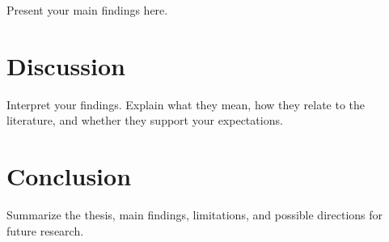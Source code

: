 \documentclass[12pt,a4paper]{article}
\begin{document}
Present your main findings here.

\section{Discussion}

Interpret your findings. Explain what they mean, how they relate to the literature,
and whether they support your expectations.

\section{Conclusion}

Summarize the thesis, main findings, limitations, and possible directions for future research.

\newpage
\printbibliography
\end{document}
